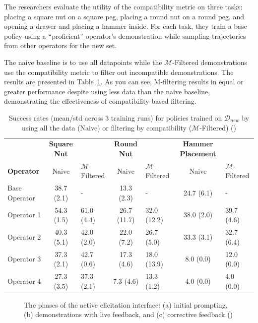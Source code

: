 \documentclass[
  letterpaper,
  numbers=noenddot,
  DIV=11]{scrreprt}
\theoremstyle{definition}
\theoremstyle{plain}
\theoremstyle{plain}
\theoremstyle{remark}
\begin{document}
The researchers evaluate the utility of the compatibility metric on
three tasks: placing a square nut on a square peg, placing a round nut
on a round peg, and opening a drawer and placing a hammer inside. For
each task, they train a base policy using a ``proficient'' operator's
demonstration while sampling trajectories from other operators for the
new set.

The naive baseline is to use all datapoints while the
\(\mathcal{M}\)-Filtered demonstrations use the compatibility metric to
filter out incompatible demonstrations. The results are presented in
Table~\ref{tbl-m_filter_table}. As you can see, M-filtering results in
equal or greater performance despite using less data than the naive
baseline, demonstrating the effectiveness of compatibility-based
filtering.

\begin{longtable}[]{@{}lclclcl@{}}
\caption{Success rates (mean/std across 3 training runs) for policies
trained on \(\mathcal{D}_{new}\) by using all the data (Naive) or
filtering by compatibility (\(\mathcal{M}\)-Filtered)
()}\label{tbl-m_filter_table}\tabularnewline
\toprule\noalign{}
\endfirsthead
\endhead
\bottomrule\noalign{}
\endlastfoot
& \textbf{Square Nut} & & \textbf{Round Nut} & & \textbf{Hammer
Placement} & \\
\textbf{Operator} & Naive & \(\mathcal{M}\)-Filtered & Naive &
\(\mathcal{M}\)-Filtered & Naive & \(\mathcal{M}\)-Filtered \\
Base Operator & 38.7 (2.1) & - & 13.3 (2.3) & - & 24.7 (6.1) & - \\
Operator 1 & 54.3 (1.5) & 61.0 (4.4) & 26.7 (11.7) & 32.0 (12.2) & 38.0
(2.0) & 39.7 (4.6) \\
Operator 2 & 40.3 (5.1) & 42.0 (2.0) & 22.0 (7.2) & 26.7 (5.0) & 33.3
(3.1) & 32.7 (6.4) \\
Operator 3 & 37.3 (2.1) & 42.7 (0.6) & 17.3 (4.6) & 18.0 (13.9) & 8.0
(0.0) & 12.0 (0.0) \\
Operator 4 & 27.3 (3.5) & 37.3 (2.1) & 7.3 (4.6) & 13.3 (1.2) & 4.0
(0.0) & 4.0 (0.0) \\
\end{longtable}

\begin{figure}


\caption{\label{fig-active_elicitation}The phases of the active
elicitation interface: (a) initial prompting, (b) demonstrations with
live feedback, and (c) corrective feedback
()}

\end{figure}%
\end{document}
